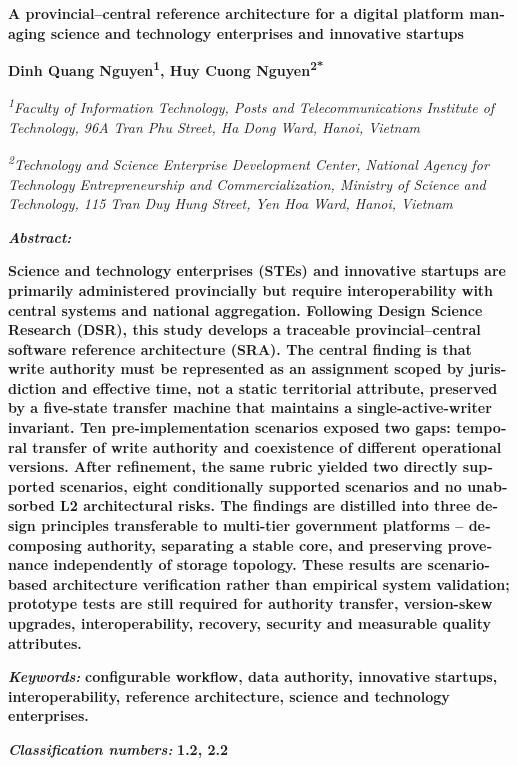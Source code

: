 \newpage
\begin{english}
\begin{center}
{\bfseries A provincial--central reference architecture for a digital platform managing science and technology enterprises and innovative startups\par}
\vspace{0.4em}
{\bfseries Dinh Quang Nguyen\textsuperscript{1}, Huy Cuong Nguyen\textsuperscript{2*}\par}
\vspace{0.3em}
{\itshape \textsuperscript{1}Faculty of Information Technology, Posts and Telecommunications Institute of Technology, 96A Tran Phu Street, Ha Dong Ward, Hanoi, Vietnam\par}
\vspace{0.15em}
{\itshape \textsuperscript{2}Technology and Science Enterprise Development Center, National Agency for Technology Entrepreneurship and Commercialization, Ministry of Science and Technology, 115 Tran Duy Hung Street, Yen Hoa Ward, Hanoi, Vietnam\par}
\end{center}

\noindent\textbf{\textit{Abstract:}}

\noindent
\textbf{Science and technology enterprises (STEs) and innovative startups are primarily administered provincially but require interoperability with central systems and national aggregation. Following Design Science Research (DSR), this study develops a traceable provincial--central software reference architecture (SRA). The central finding is that write authority must be represented as an assignment scoped by jurisdiction and effective time, not a static territorial attribute, preserved by a five-state transfer machine that maintains a single-active-writer invariant. Ten pre-implementation scenarios exposed two gaps: temporal transfer of write authority and coexistence of different operational versions. After refinement, the same rubric yielded two directly supported scenarios, eight conditionally supported scenarios and no unabsorbed L2 architectural risks. The findings are distilled into three design principles transferable to multi-tier government platforms -- decomposing authority, separating a stable core, and preserving provenance independently of storage topology. These results are scenario-based architecture verification rather than empirical system validation; prototype tests are still required for authority transfer, version-skew upgrades, interoperability, recovery, security and measurable quality attributes.}

\vspace{0.4em}
\noindent\textbf{\textit{Keywords:}} \textbf{configurable workflow, data authority, innovative startups, interoperability, reference architecture, science and technology enterprises.}

\vspace{0.2em}
\noindent\textbf{\textit{Classification numbers:}} \textbf{1.2, 2.2}
\end{english}

\newpage

